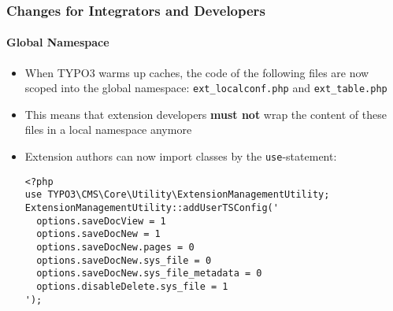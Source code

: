 %

\begin{frame}[fragile]
	\frametitle{Changes for Integrators and Developers}
	\framesubtitle{Global Namespace}


	\begin{itemize}
		\item When TYPO3 warms up caches, the code of the following files
			are now scoped into the global namespace:\newline
			\small\texttt{ext\_localconf.php} and \texttt{ext\_table.php}\normalsize
		\item This means that extension developers \textbf{must not} wrap the
			content of these files in a local namespace anymore
		\item Extension authors can now import classes by the
			\texttt{use}-statement:
\begin{lstlisting}
<?php
use TYPO3\CMS\Core\Utility\ExtensionManagementUtility;
ExtensionManagementUtility::addUserTSConfig('
  options.saveDocView = 1
  options.saveDocNew = 1
  options.saveDocNew.pages = 0
  options.saveDocNew.sys_file = 0
  options.saveDocNew.sys_file_metadata = 0
  options.disableDelete.sys_file = 1
');
\end{lstlisting}

	\end{itemize}
\end{frame}


